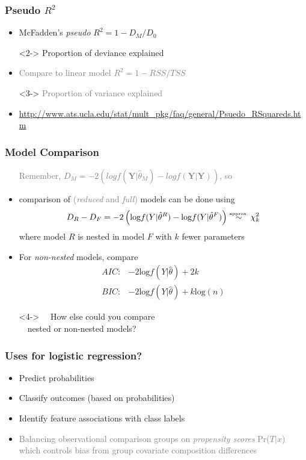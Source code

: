 \documentclass[xcolor={dvipsnames}]{beamer}
\begin{document}
\frame
{
\frametitle{Pseudo $R^2$}

\begin{itemize}
\item McFadden's \emph{pseudo} $R^2 = 1 - D_M/D_0$
\item[]<2-> Proportion of deviance explained
\item[]
\item<3->  \textcolor{gray}{Compare to linear model $R^2 = 1 - RSS/TSS$}
\item[]<3->  \textcolor{gray}{Proportion of variance explained}
\item[]
\item<4->
\url{http://www.ats.ucla.edu/stat/mult_pkg/faq/general/Psuedo_RSquareds.htm}
\end{itemize}
}

\frame
{
\frametitle{Model Comparison}

\begin{itemize}
\item[] \textcolor{gray}{Remember, $D_M = -2(log f(\textbf{Y}|\hat \theta_M) - log f(\textbf{Y}|\textbf{Y}))$, so}
\item<2-> comparison of \textcolor{gray}{(\emph{reduced} and \emph{full})} models can be done using
$$D_R - D_F = -2\left( \text{log}f(Y|\hat \theta^R) - \text{log}f(Y|\hat \theta^F)\right) \overset{\text{\tiny approx.}}{\sim} \chi^2_k$$ 
where model $R$ is nested in model $F$ with $k$ fewer parameters
\item[] 
\item<3->
For \emph{non-nested} models, compare
\begin{align*}
AIC :{}& -2 \text{log}f(Y|\hat \theta) + 2k \\
BIC :{}& -2 \text{log}f(Y|\hat \theta) + k \text{log}(n) 
\end{align*}
\item[]<4-> \huge $\quad$How else could you compare\\$\quad$nested or non-nested models?
\end{itemize}
}

\frame
{
\frametitle{Uses for logistic regression?}

\Large 
\begin{itemize}
\item<2-> Predict probabilities
\item<3-> Classify outcomes (based on probabilities)
\item<4-> Identify feature associations with class labels
\item[]
\item<5-> \textcolor{gray}{Balancing observational comparison groups on \emph{propensity scores} Pr($T|x$) which controls bias from group covariate composition differences}

\end{itemize}
}
\end{document}
